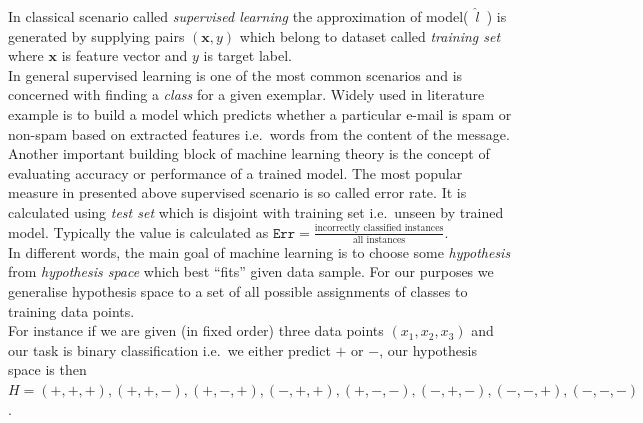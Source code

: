 \documentclass[12pt, a4paper, pdflatex, leqno]{report}
\begin{document}
In classical scenario called \emph{supervised learning} the approximation of model(~$\mathit{\hat{l}}$~) is generated by supplying pairs $(\mathit{\mathbf{x}}, \mathit{y})$ which belong to dataset called \emph{training set} where $\mathit{\mathbf{x}}$ is feature vector and $\mathit{y}$ is target label.\\
In general supervised learning is one of the most common scenarios and is concerned with finding a \emph{class} for a given exemplar. Widely used in literature example is to build a model which predicts whether a particular e-mail is spam or non-spam based on extracted features i.e.\ words from the content of the message.\\

Another important building block of machine learning theory is the concept of evaluating accuracy or performance of a trained model. The most popular measure in presented above supervised scenario is so called error rate. It is calculated using \emph{test set} which is disjoint with training set i.e.\ unseen by trained model. Typically the value is calculated as $\mathtt{Err} = \frac{\text{incorrectly classified instances}}{\text{all instances}}$.\\

In different words, the main goal of machine learning is to choose some \emph{hypothesis} from \emph{hypothesis space} which best ``fits'' given data sample. For our purposes we generalise hypothesis space to a set of all possible assignments of classes to training data points.\\
For instance if we are given (in fixed order) three data points $(x_1, x_2, x_3)$ and our task is binary classification i.e.\ we either predict $+$ or $-$, our hypothesis space is then $H = {(+, +, +), (+, +, -), (+, -, +), (-, +, +), (+, -, -), (-, +, -), (-, -, +), (-, -, -)}$.\\
\end{document}

